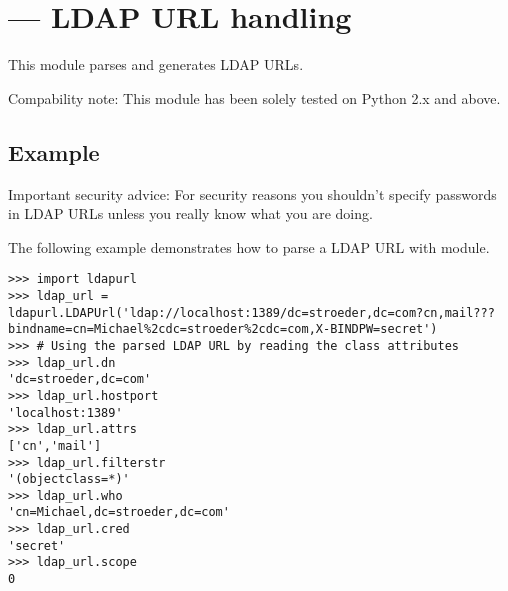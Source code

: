 

\section{ ---
         LDAP URL handling}






This module parses and generates LDAP URLs.

Compability note: This module has been solely tested on Python 2.x and above.

\begin{seealso}
\end{seealso}

\subsection{Example \label{ldap-example}}

Important security advice:
For security reasons you shouldn't specify passwords in LDAP URLs
unless you really know what you are doing.

The following example demonstrates how to parse a LDAP URL
with  module.

\begin{verbatim}
>>> import ldapurl
>>> ldap_url = ldapurl.LDAPUrl('ldap://localhost:1389/dc=stroeder,dc=com?cn,mail???bindname=cn=Michael%2cdc=stroeder%2cdc=com,X-BINDPW=secret')
>>> # Using the parsed LDAP URL by reading the class attributes
>>> ldap_url.dn
'dc=stroeder,dc=com'
>>> ldap_url.hostport
'localhost:1389'
>>> ldap_url.attrs
['cn','mail']
>>> ldap_url.filterstr
'(objectclass=*)'
>>> ldap_url.who
'cn=Michael,dc=stroeder,dc=com'
>>> ldap_url.cred
'secret'
>>> ldap_url.scope
0
\end{verbatim}

